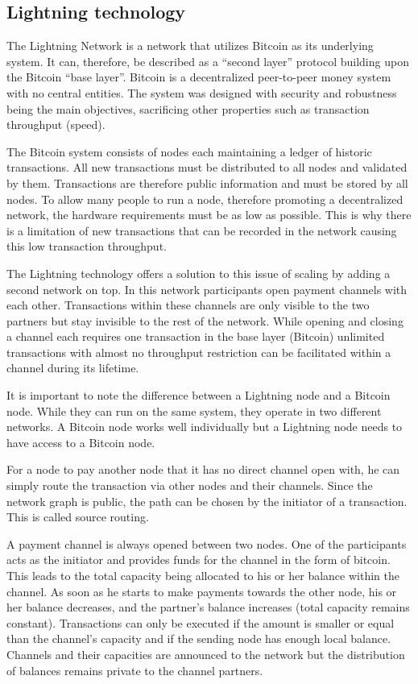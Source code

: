 \documentclass[final]{fhnwreport}       %
\begin{document}
\subsection{Lightning technology}
The Lightning Network is a network that utilizes Bitcoin as its underlying system. It can, therefore, be described as a ``second layer'' protocol building upon the Bitcoin ``base layer''. Bitcoin is a decentralized peer-to-peer money system with no central entities. The system was designed with security and robustness being the main objectives, sacrificing other properties such as transaction throughput (speed). 

The Bitcoin system consists of nodes each maintaining a ledger of historic transactions. All new transactions must be distributed to all nodes and validated by them. Transactions are therefore public information and must be stored by all nodes. To allow many people to run a node, therefore promoting a decentralized network, the hardware requirements must be as low as possible. This is why there is a limitation of new transactions that can be recorded in the network causing this low transaction throughput.

The Lightning technology offers a solution to this issue of scaling by adding a second network on top. In this network participants open payment channels with each other. Transactions within these channels are only visible to the two partners but stay invisible to the rest of the network. While opening and closing a channel each requires one transaction in the base layer (Bitcoin) unlimited transactions with almost no throughput restriction can be facilitated within a channel during its lifetime. 

It is important to note the difference between a Lightning node and a Bitcoin node. While they can run on the same system, they operate in two different networks. A Bitcoin node works well individually but a Lightning node needs to have access to a Bitcoin node.

For a node to pay another node that it has no direct channel open with, he can simply route the transaction via other nodes and their channels. Since the network graph is public, the path can be chosen by the initiator of a transaction. This is called source routing. 

A payment channel is always opened between two nodes. One of the participants acts as the initiator and provides funds for the channel in the form of bitcoin. This leads to the total capacity being allocated to his or her balance within the channel. As soon as he starts to make payments towards the other node, his or her balance decreases, and the partner's balance increases (total capacity remains constant). Transactions can only be executed if the amount is smaller or equal than the channel's capacity and if the sending node has enough local balance. Channels and their capacities are announced to the network but the distribution of balances remains private to the channel partners.
\end{document}
